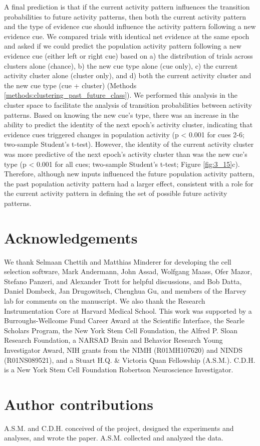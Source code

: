 \bigskip
A final prediction is that if the current activity pattern influences the transition probabilities to future activity patterns, then both the current activity pattern and the type of evidence cue should influence the activity pattern following a new evidence cue. We compared trials with identical net evidence at the same epoch and asked if we could predict the population activity pattern following a new evidence cue (either left or right cue) based on a) the distribution of trials across clusters alone (chance), b) the new cue type alone (cue only), c) the current activity cluster alone (cluster only), and d) both the current activity cluster and the new cue type (cue + cluster) (Methods \ref{methods:clustering_past_future_class}). We performed this analysis in the cluster space to facilitate the analysis of transition probabilities between activity patterns. Based on knowing the new cue’s type, there was an increase in the ability to predict the identity of the next epoch’s activity cluster, indicating that evidence cues triggered changes in population activity (p < 0.001 for cues 2-6; two-sample Student’s t-test). However, the identity of the current activity cluster was more predictive of the next epoch’s activity cluster than was the new cue’s type (p < 0.001 for all cues; two-sample Student’s t-test; Figure \ref{fig:3_15}c). Therefore, although new inputs influenced the future population activity pattern, the past population activity pattern had a larger effect, consistent with a role for the current activity pattern in defining the set of possible future activity patterns.

\section{Acknowledgements}
We thank Selmaan Chettih and Matthias Minderer for developing the cell selection software, Mark Andermann, John Assad, Wolfgang Maass, Ofer Mazor, Stefano Panzeri, and Alexander Trott for helpful discussions, and Bob Datta, Daniel Dombeck, Jan Drugowitsch, Chenghua Gu, and members of the Harvey lab for comments on the manuscript. We also thank the Research Instrumentation Core at Harvard Medical School. This work was supported by a Burroughs-Wellcome Fund Career Award at the Scientific Interface, the Searle Scholars Program, the New York Stem Cell Foundation, the Alfred P. Sloan Research Foundation, a NARSAD Brain and Behavior Research Young Investigator Award, NIH grants from the NIMH (R01MH107620) and NINDS (R01NS089521), and a Stuart H.Q. \& Victoria Quan Fellowship (A.S.M.). C.D.H. is a New York Stem Cell Foundation Robertson Neuroscience Investigator.

\section{Author contributions}
A.S.M. and C.D.H. conceived of the project, designed the experiments and analyses, and wrote the paper. A.S.M. collected and analyzed the data. 


 












